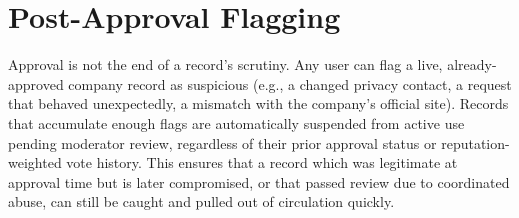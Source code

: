 \section{Post-Approval Flagging}
Approval is not the end of a record's scrutiny. Any user can flag a live, already-approved company record as suspicious (e.g., a changed privacy contact, a request that behaved unexpectedly, a mismatch with the company's official site). Records that accumulate enough flags are automatically suspended from active use pending moderator review, regardless of their prior approval status or reputation-weighted vote history. This ensures that a record which was legitimate at approval time but is later compromised, or that passed review due to coordinated abuse, can still be caught and pulled out of circulation quickly.


\sentinelchapterend
